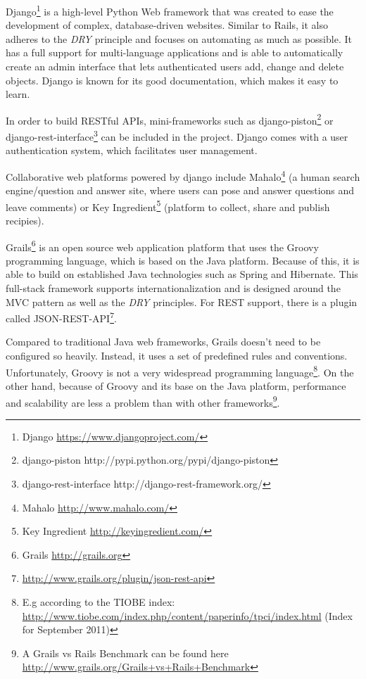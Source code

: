 Django\footnote{Django \url{https://www.djangoproject.com/}} is a high-level Python Web framework that was created to ease the development of complex, database-driven websites. Similar to Rails, it also adheres to the \textit{DRY} principle and focuses on automating as much as possible. %
It has a full support for multi-language applications and is able to automatically create an admin interface that lets authenticated users add, change and delete objects. Django is known for its good documentation, which makes it easy to learn.

In order to build RESTful APIs, mini-frameworks such as django-piston\footnote{django-piston http://pypi.python.org/pypi/django-piston} or django-rest-interface\footnote{django-rest-interface http://django-rest-framework.org/} can be included in the project. Django comes with a user authentication system, which facilitates user management. 

Collaborative web platforms powered by django include Mahalo\footnote{Mahalo \url{http://www.mahalo.com/}} (a human search engine/question and answer site, where users can pose and answer questions and leave comments) or Key Ingredient\footnote{Key Ingredient \url{http://keyingredient.com/}} (platform to collect, share and publish recipies).   

Grails\footnote{Grails \url{http://grails.org}} is an open source web application platform that uses the Groovy programming language, which is based on the Java platform. Because of this, it is able to build on established Java technologies such as Spring and Hibernate. This full-stack framework supports internationalization and is designed around the MVC pattern as well as the \textit{DRY} principles.
For REST support, there is a plugin called JSON-REST-API\footnote{\url{http://www.grails.org/plugin/json-rest-api}}.

Compared to traditional Java web frameworks, Grails doesn't need to be configured so heavily. Instead, it uses a set of predefined rules and conventions. Unfortunately, Groovy is not a very widespread programming language\footnote{E.g according to the TIOBE index: \url{http://www.tiobe.com/index.php/content/paperinfo/tpci/index.html} (Index for September 2011)}. On the other hand, because of Groovy and its base on the Java platform, performance and scalability are less a problem than with other frameworks\footnote{A Grails vs Rails Benchmark can be found here \url{http://www.grails.org/Grails+vs+Rails+Benchmark}}. 

